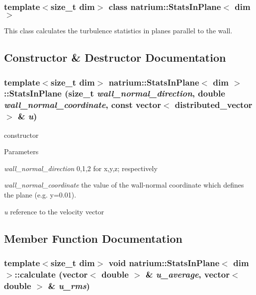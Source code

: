 \subsubsection*{template$<$size\_\-t dim$>$ class natrium::StatsInPlane$<$ dim $>$}

This class calculates the turbulence statistics in planes parallel to the wall. 

\subsection{Constructor \& Destructor Documentation}
\hypertarget{classnatrium_1_1StatsInPlane_aea872f2aa9980983764aed1866f53903}{
\subsubsection[{StatsInPlane}]{\setlength{\rightskip}{0pt plus 5cm}template$<$size\_\-t dim$>$ {\bf natrium::StatsInPlane}$<$ dim $>$::{\bf StatsInPlane} (size\_\-t {\em wall\_\-normal\_\-direction}, \/  double {\em wall\_\-normal\_\-coordinate}, \/  const vector$<$ {\bf distributed\_\-vector} $>$ \& {\em u})}}
\label{classnatrium_1_1StatsInPlane_aea872f2aa9980983764aed1866f53903}


constructor 
\begin{DoxyParams}{Parameters}
\item[{\em wall\_\-normal\_\-direction}]0,1,2 for x,y,z; respectively \item[{\em wall\_\-normal\_\-coordinate}]the value of the wall-\/normal coordinate which defines the plane (e.g. y=0.01). \item[{\em u}]reference to the velocity vector \end{DoxyParams}


\subsection{Member Function Documentation}
\hypertarget{classnatrium_1_1StatsInPlane_a648a470e8c462c10c9915a7a920c50ef}{
\subsubsection[{calculate}]{\setlength{\rightskip}{0pt plus 5cm}template$<$size\_\-t dim$>$ void {\bf natrium::StatsInPlane}$<$ dim $>$::calculate (vector$<$ double $>$ \& {\em u\_\-average}, \/  vector$<$ double $>$ \& {\em u\_\-rms})}}
\label{classnatrium_1_1StatsInPlane_a648a470e8c462c10c9915a7a920c50ef}


